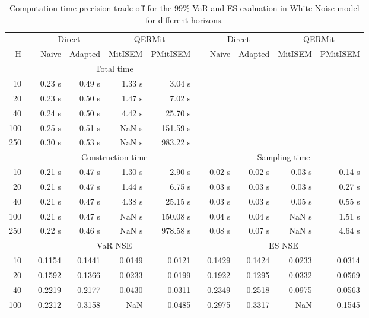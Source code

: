 { \renewcommand{\arraystretch}{1.3} 
\begin{table}[h] 
\centering 
\caption{Computation time-precision trade-off for the  $99\%$ VaR and ES evaluation in White Noise model for different horizons.} 
\label{tab:time_precision_WN} 
\begin{tabular}{rr rrrr r rrrr}  
 & & \multicolumn{2}{c}{Direct} & \multicolumn{2}{c}{QERMit}&  & \multicolumn{2}{c}{Direct} & \multicolumn{2}{c}{QERMit} \\ \cline{3-6} \cline{8-11} 
 H & & Naive & Adapted & MitISEM & PMitISEM & & Naive & Adapted & MitISEM & PMitISEM \\ \hline 
 & & \multicolumn{4}{c}{Total time}  \\ \cline{3-6} 
10 & & 0.23 s & 0.49 s & 1.33 s & 3.04 s \\ 
20 & & 0.23 s & 0.50 s & 1.47 s & 7.02 s \\ 
40 & & 0.24 s & 0.50 s & 4.42 s & 25.70 s \\ 
100 & & 0.25 s & 0.51 s &  NaN s & 151.59 s \\ 
250 & & 0.30 s & 0.53 s &  NaN s & 983.22 s \\ 
\hline 
 & & \multicolumn{4}{c}{Construction time} & & \multicolumn{4}{c}{ Sampling time} \\ \cline{3-6}  \cline{8-11}
10 & & 0.21 s & 0.47 s & 1.30 s & 2.90 s && 0.02 s & 0.02 s & 0.03 s & 0.14 s \\ 
20 & & 0.21 s & 0.47 s & 1.44 s & 6.75 s && 0.03 s & 0.03 s & 0.03 s & 0.27 s \\ 
40 & & 0.21 s & 0.47 s & 4.38 s & 25.15 s && 0.03 s & 0.03 s & 0.05 s & 0.55 s \\ 
100 & & 0.21 s & 0.47 s &  NaN s & 150.08 s && 0.04 s & 0.04 s &  NaN s & 1.51 s \\ 
250 & & 0.22 s & 0.46 s &  NaN s & 978.58 s && 0.08 s & 0.07 s &  NaN s & 4.64 s \\ 
\hline 
 & & \multicolumn{4}{c}{VaR NSE} &&  \multicolumn{4}{c}{ES NSE} \\ \cline{3-6}  \cline{8-11}
10 && 0.1154  & 0.1441  & 0.0149 & 0.0121 && 0.1429  & 0.1424  & 0.0233 & 0.0314 \\ 
20 && 0.1592  & 0.1366  & 0.0233 & 0.0199 && 0.1922  & 0.1295  & 0.0332 & 0.0569 \\ 
40 && 0.2219  & 0.2177  & 0.0430 & 0.0311 && 0.2349  & 0.2518  & 0.0975 & 0.0563 \\ 
100 && 0.2212  & 0.3158  &    NaN & 0.0485 && 0.2975  & 0.3317  &    NaN & 0.1545 \\ 

\end{tabular}
\end{table}}

